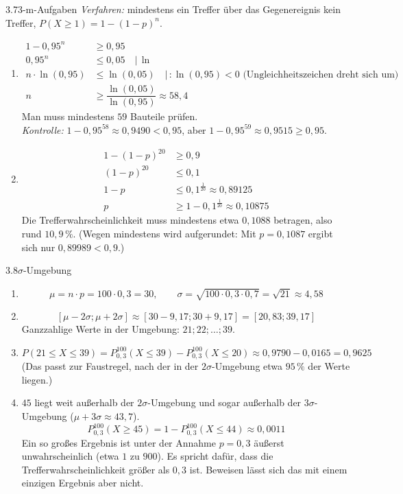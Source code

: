 \begin{loesung}{3.7}{3-m-Aufgaben}
\textit{Verfahren:} \glqq mindestens ein Treffer\grqq{} über das Gegenereignis \glqq kein Treffer\grqq, $P(X\geq 1) = 1-(1-p)^n$.
\begin{enumerate}[label=\alph*)]
  \item \begin{align*}
    1-0{,}95^n &\geq 0{,}95\\
    0{,}95^n &\leq 0{,}05 \quad\big|\,\ln\\
    n\cdot\ln{(0{,}95)} &\leq \ln{(0{,}05)} \quad\big|\,:\ln{(0{,}95)}<0 \text{ (Ungleichheitszeichen dreht sich um)}\\
    n &\geq \dfrac{\ln{(0{,}05)}}{\ln{(0{,}95)}}\approx 58{,}4
  \end{align*}
  Man muss mindestens $59$ Bauteile prüfen.\\
  \textit{Kontrolle:} $1-0{,}95^{58}\approx 0{,}9490 < 0{,}95$, aber $1-0{,}95^{59}\approx 0{,}9515\geq 0{,}95$.
  \item \begin{align*}
    1-(1-p)^{20} &\geq 0{,}9\\
    (1-p)^{20} &\leq 0{,}1\\
    1-p &\leq 0{,}1^{\frac{1}{20}}\approx 0{,}89125\\
    p &\geq 1-0{,}1^{\frac{1}{20}}\approx 0{,}10875
  \end{align*}
  Die Trefferwahrscheinlichkeit muss mindestens etwa $0{,}1088$ betragen, also rund $10{,}9\,\%$. (Wegen \glqq mindestens\grqq{} wird aufgerundet: Mit $p=0{,}1087$ ergibt sich nur $0{,}89989 < 0{,}9$.)
\end{enumerate}
\end{loesung}

\begin{loesung}{3.8}{\texorpdfstring{\(\sigma\)}{Sigma}-Umgebung}
\begin{enumerate}[label=\alph*)]
  \item \[\mu = n\cdot p = 100\cdot 0{,}3 = 30,\qquad\sigma = \sqrt{100\cdot 0{,}3\cdot 0{,}7} = \sqrt{21}\approx 4{,}58\]
  \item \[[\mu-2\sigma;\mu+2\sigma]\approx[30-9{,}17;30+9{,}17] = [20{,}83;39{,}17]\]
  Ganzzahlige Werte in der Umgebung: $21;22;\ldots;39$.
  \item \[P(21\leq X\leq 39) = P^{100}_{0{,}3}(X\leq 39)-P^{100}_{0{,}3}(X\leq 20)\approx 0{,}9790-0{,}0165 = 0{,}9625\]
  (Das passt zur Faustregel, nach der in der $2\sigma$-Umgebung etwa $95\,\%$ der Werte liegen.)
  \item $45$ liegt weit außerhalb der $2\sigma$-Umgebung und sogar außerhalb der $3\sigma$-Umgebung ($\mu+3\sigma\approx 43{,}7$).
  \[P^{100}_{0{,}3}(X\geq 45) = 1-P^{100}_{0{,}3}(X\leq 44)\approx 0{,}0011\]
  Ein so großes Ergebnis ist unter der Annahme $p=0{,}3$ äußerst unwahrscheinlich (etwa $1$ zu $900$). Es spricht dafür, dass die Trefferwahrscheinlichkeit größer als $0{,}3$ ist. Beweisen lässt sich das mit einem einzigen Ergebnis aber nicht.
\end{enumerate}
\end{loesung}

